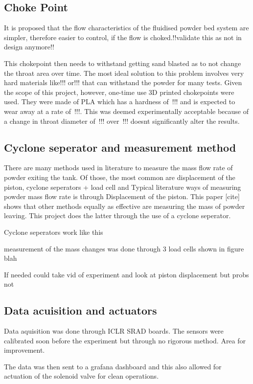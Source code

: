 \subsection{Choke Point}
It is proposed that the flow characteristics of the fluidised powder bed system are simpler, therefore easier to control, if the flow is choked.!!validate this as not in design anymore!!


This chokepoint then needs to withstand getting sand blasted as to not change the throat area over time. The most ideal solution to this problem involves very hard materials like!!! or!!! that can withstand the powder for many tests. Given the scope of this project, however, one-time use 3D printed chokepoints were used. They were made of PLA which has a hardness of~!!! and is expected to wear away at a rate of~!!!. This was deemed experimentally acceptable because of a change in throat diameter of~!!! over~!!! doesnt significantly alter the results.

\newpage
\subsection{Cyclone seperator and measurement method}
There are many methods used in literature to measure the mass flow rate of powder exiting the tank. Of those, the most common are displacement of the piston, cyclone seperators + load cell and 
Typical literature ways of measuring powder mass flow rate is through Displacement of the piston. This paper [cite] shows that other methods equally as effective are measuring the mass of powder leaving. This project does the latter through the use of a cyclone seperator.

Cyclone seperators work like this

measurement of the mass changes was done through 3 load cells shown in figure blah

If needed could take vid of experiment and look at piston displacement but probs not

\subsection{Data acuisition and actuators}
Data aquisition was done through ICLR SRAD boards. The sensors were calibrated soon before the experiment but through no rigorous method. Area for improvement.

The data was then sent to a grafana dashboard and this also allowed for actuation of the solenoid valve for clean operations.

